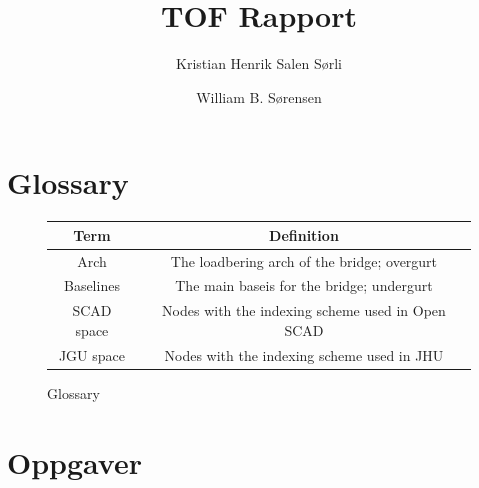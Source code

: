\documentclass{report}
\author{
  Kristian Henrik Salen Sørli
  \and
  William B. Sørensen\\
}
\title{TOF Rapport}
\begin{document}
\maketitle

\tableofcontents

\chapter{Glossary}

\begin{figure}[H]
	\centering
	\begin{tabular}{c|c}
		Term       & Definition                                       \\
		\hline
		Arch       & The loadbering arch of the bridge; overgurt      \\
		Baselines  & The main baseis for the bridge; undergurt        \\
		SCAD space & Nodes with the indexing scheme used in Open SCAD \\
		JGU space  & Nodes with the indexing scheme used in JHU       \\
	\end{tabular}
	\caption{Glossary}
\end{figure}

\chapter{Oppgaver}





\end{document}
